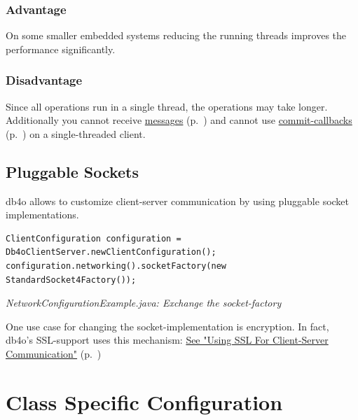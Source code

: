 \subsubsection*{Advantage}

On some smaller embedded systems reducing the running threads improves the performance significantly.

\subsubsection*{Disadvantage}

Since all operations run in a single thread, the operations may take longer. Additionally you cannot receive \hyperref[ref:client-server-messaging]{messages} (p.~\pageref{ref:client-server-messaging}) and cannot use \hyperref[ref:advanced-topics-callbacks-event-registry-api]{commit-callbacks} (p.~\pageref{ref:advanced-topics-callbacks-event-registry-api}) on a single-threaded client.

\subsection{Pluggable Sockets}
\label{ref:configuration-networking-pluggable-sockets}

db4o allows to customize client-server communication by using pluggable socket implementations.

\begin{lstlisting}
ClientConfiguration configuration = Db4oClientServer.newClientConfiguration();
configuration.networking().socketFactory(new StandardSocket4Factory());
\end{lstlisting}

{\small\itshape NetworkConfigurationExample.java: Exchange the socket-factory\par}
\medskip

One use case for changing the socket-implementation is encryption. In fact, db4o's SSL-support uses this mechanism: \hyperref[ref:client-server-pluggable-sockets-using-ssl-for-client-server-communication]{See "Using SSL For Client-Server Communication"} (p.~\pageref{ref:client-server-pluggable-sockets-using-ssl-for-client-server-communication})

\section{Class Specific Configuration}
\label{ref:configuration-objectclass-configuration}

